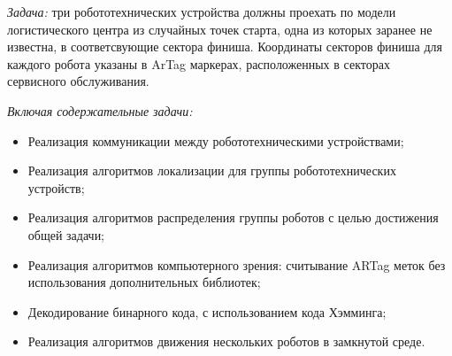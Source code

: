 
\textit{Задача:} три робототехнических устройства должны проехать по модели логистического
центра из случайных точек старта, одна из которых заранее не известна, в соответсвующие сектора финиша. Координаты секторов финиша для каждого
робота указаны в ArTag маркерах, расположенных в секторах сервисного обслуживания.


\textit{Включая содержательные задачи:}
\begin{itemize}
    \item Реализация коммуникации между робототехническими устройствами;
    \item Реализация алгоритмов локализации для группы робототехнических устройств;
    \item Реализация алгоритмов распределения группы роботов с целью достижения общей задачи;
    \item Реализация алгоритмов компьютерного зрения: считывание ARTag меток без
    использования дополнительных библиотек;
    \item Декодирование бинарного кода, с использованием кода Хэмминга;
    \item Реализация алгоритмов движения нескольких роботов в замкнутой среде.
\end{itemize}